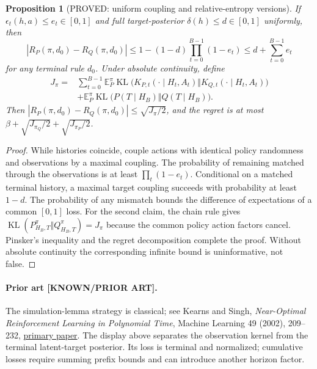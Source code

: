 \documentclass[11pt]{article}
\newcommand{\E}{\mathbb E}
\newtheorem{proposition}[theorem]{Proposition}
\theoremstyle{definition}
\theoremstyle{remark}
\begin{document}
\begin{proposition}[PROVED: uniform coupling and relative-entropy versions]
If $\epsilon_t(h,a)\leq e_t\in[0,1]$ and full target-posterior
$\delta(h)\leq d\in[0,1]$ uniformly, then
\begin{equation}
 |R_P(\pi,d_0)-R_Q(\pi,d_0)|
 \leq1-(1-d)\prod_{t=0}^{B-1}(1-e_t)
 \leq d+\sum_{t=0}^{B-1}e_t
 \label{eq:r3-coupling}
\end{equation}
for any terminal rule $d_0$.
Under absolute continuity, define
\begin{align*}
 J_\pi={}&\sum_{t=0}^{B-1}\E_P^\pi
 \operatorname{KL}\bigl(K_{P,t}(\cdot\mid H_t,A_t)
                    \Vert K_{Q,t}(\cdot\mid H_t,A_t)\bigr)\\
 &+\E_P^\pi\operatorname{KL}\bigl(P(T\mid H_B)\Vert Q(T\mid H_B)\bigr).
\end{align*}
Then $|R_P(\pi,d_0)-R_Q(\pi,d_0)|\leq\sqrt{J_\pi/2}$, and the regret
is at most $\beta+\sqrt{J_{\pi_Q}/2}+\sqrt{J_{\pi_P}/2}$.
\end{proposition}
\begin{proof}
While histories coincide, couple actions with identical policy randomness
and observations by a maximal coupling.  The probability of remaining
matched through the observations is at least $\prod_t(1-e_t)$.  Conditional
on a matched terminal history, a maximal target coupling succeeds with
probability at least $1-d$.  The probability of any mismatch bounds the
difference of expectations of a common $[0,1]$ loss.  For the second claim,
the chain rule gives
$\operatorname{KL}(P^\pi_{H_B,T}\Vert Q^\pi_{H_B,T})=J_\pi$ because the
common policy action factors cancel.  Pinsker's inequality and the
regret decomposition complete the proof.  Without absolute continuity
the corresponding infinite bound is uninformative, not false.
\end{proof}

\paragraph{Prior art [KNOWN/PRIOR ART].}
The simulation-lemma strategy is classical; see Kearns and Singh,
\emph{Near-Optimal Reinforcement Learning in Polynomial Time}, Machine
Learning 49 (2002), 209--232,
\href{https://people.eecs.berkeley.edu/~pabbeel/cs287-fa09/readings/KearnsSingh_E3_2002.pdf}{primary paper}.
The display above separates the observation kernel from the terminal
latent-target posterior.  Its loss is terminal and normalized; cumulative
losses require summing prefix bounds and can introduce another horizon
factor.
\end{document}
